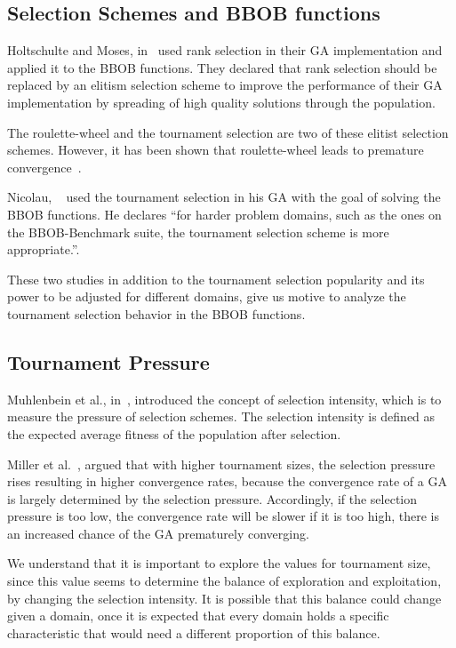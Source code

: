 \subsection{Selection Schemes and BBOB functions}



Holtschulte and Moses, in~\cite{holtschulte2013benchmarking} used rank selection in their GA implementation and applied it to the BBOB functions. They declared that rank selection should be replaced by an elitism selection scheme to improve the performance of their GA implementation by spreading of high quality solutions through the population. 

The roulette-wheel and the tournament selection are two of these elitist selection schemes. However, it has been shown that roulette-wheel leads to premature convergence~\cite{baker1987reducing}. 

Nicolau, ~\cite{nicolau2009application} used the tournament selection in his GA with the goal of solving the BBOB functions. He declares ``for harder problem domains, such as the ones on the BBOB-Benchmark suite, the tournament selection scheme is more appropriate.''.

These two studies in addition to the tournament selection popularity and its power to be adjusted for different domains, give us motive to analyze the tournament selection behavior in the BBOB functions.


\subsection{Tournament Pressure}\label{sec:background:tournament_pressure} 
Muhlenbein et al., in~\cite{muhlenbein1993predictive}, introduced the concept of selection intensity, which is to measure the pressure of selection schemes. The selection intensity is defined as the expected average fitness of the population after selection.  

Miller et al.~\cite{miller1995genetic}, argued that with higher tournament sizes, the selection pressure rises resulting in higher convergence rates, because the convergence rate of a GA is largely determined by the selection pressure.  Accordingly, if the selection pressure is too low, the convergence rate will be slower if it is too high, there is an increased chance of the GA prematurely converging. 

We understand that it is important to explore the values for tournament size, since this value seems to determine the balance of exploration and exploitation, by changing the selection intensity. It is possible that this balance could change given a domain, once it is expected that every domain holds a specific characteristic that would need a different proportion of this balance.

